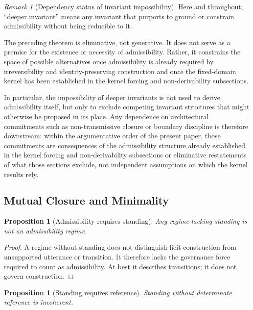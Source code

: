 \documentclass[11pt]{article}
\newtheorem{proposition}[theorem]{Proposition}
\theoremstyle{definition}
\theoremstyle{remark}
\newtheorem{remark}[theorem]{Remark}
\begin{document}
\begin{remark}[Dependency status of invariant impossibility]
Here and throughout, ``deeper invariant'' means any invariant that purports to ground or constrain admissibility without being reducible to it.

The preceding theorem is eliminative, not generative. It does not serve as a premise for the existence or necessity of admissibility. Rather, it constrains the space of possible alternatives once admissibility is already required by irreversibility and identity-preserving construction and once the fixed-domain kernel has been established in the kernel forcing and non-derivability subsections.

In particular, the impossibility of deeper invariants is not used to derive admissibility itself, but only to exclude competing invariant structures that might otherwise be proposed in its place. Any dependence on architectural commitments such as non-transmissive closure or boundary discipline is therefore downstream: within the argumentative order of the present paper, those commitments are consequences of the admissibility structure already established in the kernel forcing and non-derivability subsections or eliminative restatements of what those sections exclude, not independent assumptions on which the kernel results rely.
\end{remark}

\subsection{Mutual Closure and Minimality}

\begin{proposition}[Admissibility requires standing]\label{prop:admissibility-requires-standing}
Any regime lacking standing is not an admissibility regime.
\end{proposition}

\begin{proof}
A regime without standing does not distinguish licit construction from unsupported utterance or transition. It therefore lacks the governance force required to count as admissibility. At best it describes transitions; it does not govern construction.
\end{proof}

\begin{proposition}[Standing requires reference]\label{prop:standing-requires-reference}
Standing without determinate reference is incoherent.
\end{proposition}
\end{document}
